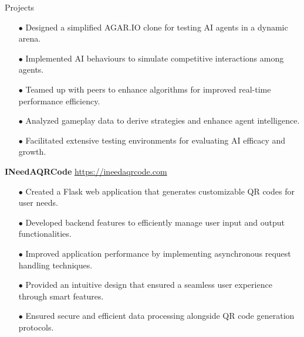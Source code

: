 \begin{rSection}{Projects}
\begin{itemize}[label=\myfancylabel, leftmargin=0.5cm, topsep=-5pt, itemsep=-1ex]
\setlength\itemsep{-0.25cm}
    \item[$\bullet$] Designed a simplified AGAR.IO clone for testing AI agents in a dynamic arena.
    \item[$\bullet$] Implemented AI behaviours to simulate competitive interactions among agents.
    \item[$\bullet$] Teamed up with peers to enhance algorithms for improved real-time performance efficiency.
    \item[$\bullet$] Analyzed gameplay data to derive strategies and enhance agent intelligence.
    \item[$\bullet$] Facilitated extensive testing environments for evaluating AI efficacy and growth.
\end{itemize}
\vspace{0.4cm}
{\bf INeedAQRCode}
\hspace{2 cm}{Python, Flask, Web Development}
\hfill{\href{https://ineedaqrcode.com}{https://ineedaqrcode.com}}
\begin{itemize}[label=\myfancylabel, leftmargin=0.5cm, topsep=-5pt, itemsep=-1ex]
\setlength\itemsep{-0.25cm}
    \item[$\bullet$] Created a Flask web application that generates customizable QR codes for user needs.
    \item[$\bullet$] Developed backend features to efficiently manage user input and output functionalities.
    \item[$\bullet$] Improved application performance by implementing asynchronous request handling techniques.
    \item[$\bullet$] Provided an intuitive design that ensured a seamless user experience through smart features.
    \item[$\bullet$] Ensured secure and efficient data processing alongside QR code generation protocols.
\end{itemize}
\end{rSection}